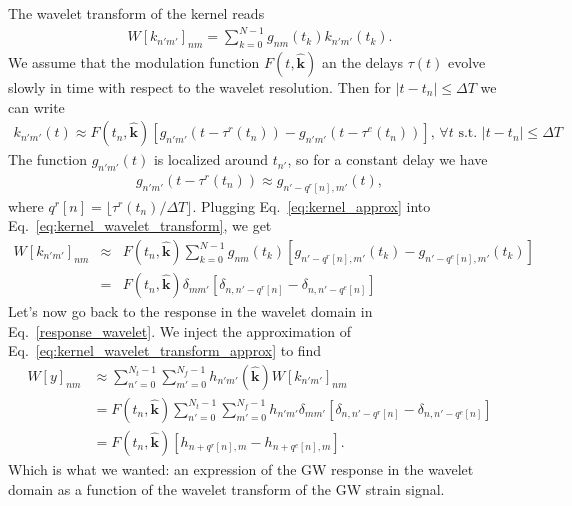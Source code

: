 \documentclass{article}
\begin{document}
The wavelet transform of the kernel reads
\begin{eqnarray}
\label{eq:kernel_wavelet_transform}
    W[k_{n'm'}]_{nm} = \sum_{k=0}^{N-1} g_{nm}(t_k) k_{n'm'}(t_k).
\end{eqnarray}
We assume that the modulation function $F(t, \hat{\mathbf{k}})$ an the delays $\tau(t)$ evolve slowly in time with respect to the wavelet resolution.
Then for $|t - t_n| \leq \Delta T$ we can write
\begin{eqnarray}
\label{eq:kernel_approx}
    k_{n'm'}(t) \approx F(t_n, \hat{\mathbf{k}})  \left[ 
 g_{n'm'}\left(t-\tau^{r}(t_n)\right) -g_{n'm'}\left(t-\tau^{e}(t_n)\right) \right],\, \forall t \text{ s.t. } |t - t_n| \leq \Delta T
\end{eqnarray}
The function $g_{n'm'}(t)$ is localized around $t_{n'}$, so for a constant delay we have
\begin{eqnarray}
g_{n'm'}(t - \tau^{r}(t_n)) \approx g_{n'-q^{r}[n],m'}(t),
\end{eqnarray}
where $q^{r}[n] = \lfloor \tau^{r}(t_n) / \Delta T \rfloor$.
Plugging Eq.~\eqref{eq:kernel_approx} into Eq.~\eqref{eq:kernel_wavelet_transform}, we get
\begin{eqnarray}
\label{eq:kernel_wavelet_transform_approx}
    W[k_{n'm'}]_{nm} & \approx & F(t_n, \hat{\mathbf{k}}) \sum_{k=0}^{N-1} g_{nm}(t_k) 
    \left[ g_{n'-q^{r}[n], m'}(t_k) - g_{n'-q^{e}[n], m'}(t_k) \right] \nonumber \\
    & = & F(t_n, \hat{\mathbf{k}}) \delta_{mm'} \left[ \delta_{n, n'-q^{r}[n]} - \delta_{n, n'-q^{e}[n]}\right]
\end{eqnarray}
Let's now go back to the response in the wavelet domain in Eq.~\eqref{response_wavelet}. We inject the approximation of Eq.~\eqref{eq:kernel_wavelet_transform_approx} to find
\begin{align}
\label{response_wavelet_approx}
W[y]_{nm} & \approx  \sum_{n'=0}^{N_t-1}\sum_{m'=0}^{N_f-1}h_{n'm'}(\hat{\mathbf{k}}) W[k_{n'm'}]_{nm} \nonumber \\
& =  F(t_n, \hat{\mathbf{k}})  \sum_{n'=0}^{N_t-1}\sum_{m'=0}^{N_f-1}h_{n'm'} \delta_{mm'} \left[ \delta_{n, n'-q^{r}[n]} - \delta_{n, n'-q^{e}[n]}\right] \nonumber \\
& = F(t_n, \hat{\mathbf{k}}) \left[ h_{n+q^{r}[n], m} - h_{n+q^{e}[n], m}\right].
\end{align}
Which is what we wanted: an expression of the GW response in the wavelet domain as a function of the wavelet transform of the GW strain signal. 
\end{document}
